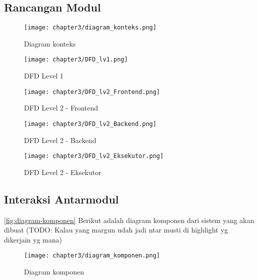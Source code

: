 \subsection{Rancangan Modul}

\begin{figure}[H]
  \centering
  \texttt{[image: chapter3/diagram\_konteks.png]}
  \caption{Diagram konteks} \label{fig:diagram-konteks}
\end{figure}

\begin{figure}[H]
  \centering
  \texttt{[image: chapter3/DFD\_lv1.png]}
  \caption{DFD Level 1} \label{fig:dfd-lv1}
\end{figure}

\begin{figure}[H]
  \centering
  \texttt{[image: chapter3/DFD\_lv2\_Frontend.png]}
  \caption{DFD Level 2 - Frontend} \label{fig:dfd-lv2-frontend}
\end{figure}

\begin{figure}[H]
  \centering
  \texttt{[image: chapter3/DFD\_lv2\_Backend.png]}
  \caption{DFD Level 2 - Backend} \label{fig:dfd-lv2-backend}
\end{figure}

\begin{figure}[H]
  \centering
  \texttt{[image: chapter3/DFD\_lv2\_Eksekutor.png]}
  \caption{DFD Level 2 - Eksekutor} \label{fig:dfd-lv2-eksekutor}
\end{figure}

\blindtext

\subsection{Interaksi Antarmodul}

\autoref{fig:diagram-komponen} Berikut adalah diagram komponen dari sistem yang akan dibuat (TODO: Kalau yang margun udah jadi ntar musti di highlight yg dikerjain yg mana)

\begin{figure}[H]
  \centering
  \texttt{[image: chapter3/diagram\_komponen.png]}
  \caption{Diagram komponen} \label{fig:diagram-komponen}
\end{figure}

\blindtext